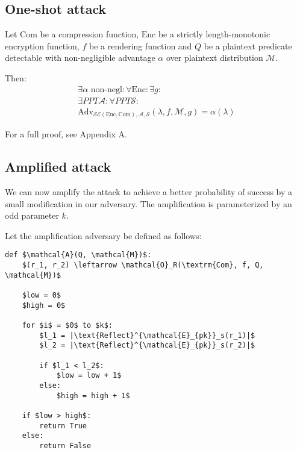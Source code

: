 \subsection{One-shot attack}

\begin{lemma}

Let $\textrm{Com}$ be a compression function, $\textrm{Enc}$ be a strictly length-monotonic
encryption function, $f$ be a rendering function and $Q$ be a plaintext
predicate detectable with non-negligible advantage $\alpha$ over plaintext
distribution $\mathcal{M}$.

Then:
\begin{align*}
    \exists \alpha \text{ non-negl}:
    \forall \textrm{Enc}:
    \exists g:\\
    \exists PPT \mathcal{A}:
    \forall PPT \mathcal{S}:\\
    \text{Adv}_{\mathcal{SE}(\textrm{Enc}, \textrm{Com}), \mathcal{A}, \mathcal{S}}
    (\lambda, f, \mathcal{M}, g) = \alpha(\lambda)
\end{align*}

\end{lemma}

For a full proof, see Appendix A.

\subsection{Amplified attack}\label{subsec:amplification}

We can now amplify the attack to achieve a better probability of success by a small modification in our adversary.
The amplification is parameterized by an odd parameter $k$.

Let the amplification adversary be defined as follows:

\begin{lstlisting}[texcl,mathescape,basicstyle=\small]
def $\mathcal{A}(Q, \mathcal{M})$:
    $(r_1, r_2) \leftarrow \mathcal{O}_R(\textrm{Com}, f, Q, \mathcal{M})$

    $low = 0$
    $high = 0$

    for $i$ = $0$ to $k$:
        $l_1 = |\text{Reflect}^{\mathcal{E}_{pk}}_s(r_1)|$
        $l_2 = |\text{Reflect}^{\mathcal{E}_{pk}}_s(r_2)|$

        if $l_1 < l_2$:
            $low = low + 1$
        else:
            $high = high + 1$

    if $low > high$:
        return True
    else:
        return False
\end{lstlisting}

